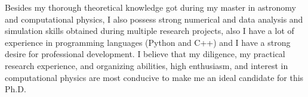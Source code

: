


Besides my thorough theoretical knowledge got during my master in astronomy and computational physics, I also possess strong numerical and data analysis and simulation skills obtained during multiple research projects, also I have a lot of experience in programming languages (Python and C++)  and I have a strong desire for professional development. I believe that my diligence, my practical research experience, and organizing abilities, high enthusiasm, and interest in computational physics are most conducive to make me an ideal candidate for this Ph.D.



 
